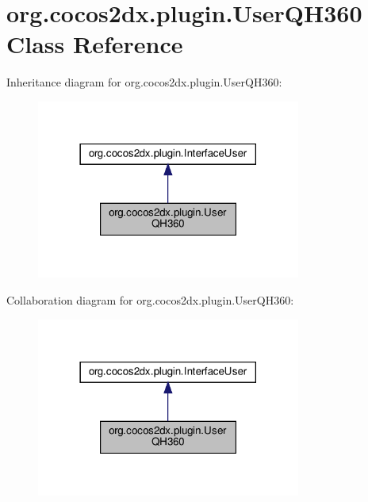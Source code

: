 \hypertarget{classorg_1_1cocos2dx_1_1plugin_1_1UserQH360}{}\section{org.\+cocos2dx.\+plugin.\+User\+Q\+H360 Class Reference}
\label{classorg_1_1cocos2dx_1_1plugin_1_1UserQH360}


Inheritance diagram for org.\+cocos2dx.\+plugin.\+User\+Q\+H360\+:
\nopagebreak
\begin{figure}[H]
\begin{center}
\leavevmode
\includegraphics[width=246pt]{classorg_1_1cocos2dx_1_1plugin_1_1UserQH360__inherit__graph}
\end{center}
\end{figure}


Collaboration diagram for org.\+cocos2dx.\+plugin.\+User\+Q\+H360\+:
\nopagebreak
\begin{figure}[H]
\begin{center}
\leavevmode
\includegraphics[width=246pt]{classorg_1_1cocos2dx_1_1plugin_1_1UserQH360__coll__graph}
\end{center}
\end{figure}
